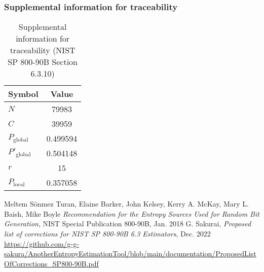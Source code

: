 \documentclass[a3paper,xelatex,english]{bxjsarticle}
\begin{document}
\subsubsection{Supplemental information for traceability}
\renewcommand{\arraystretch}{1.8}
\begin{table}[h]
\caption{Supplemental information for traceability (NIST SP 800-90B Section 6.3.10)}
\begin{center}
\begin{tabular}{|l|c|}
\hline 
\rowcolor{anotherlightblue} %
Symbol				& Value \\ \hline 
$N$				& 79983\\ \hline 
$C$				& 39959\\ \hline 
$P_{\textrm{global}}$				& 0.499594\\ \hline 
$P'_{\textrm{global}}$			& 0.504148\\ \hline 
$r$				& 15\\ \hline 
$P_{\textrm{local}}$ 			& 0.357058\\ \hline
\end{tabular}
\end{center}
\end{table}
\renewcommand{\arraystretch}{1.4}
\begin{thebibliography}{99}
Meltem S\"{o}nmez Turan,
Elaine Barker,
John Kelsey,
Kerry A. McKay,
Mary L. Baish,
Mike Boyle
\textit{Recommendation for the Entropy Sources Used for Random Bit Generation},
NIST Special Publication 800-90B, Jan. 2018
G. Sakurai, \textit{Proposed list of corrections for NIST SP 800-90B 6.3 Estimators}, Dec. 2022
\url{https://github.com/g-g-sakura/AnotherEntropyEstimationTool/blob/main/documentation/ProposedListOfCorrections_SP800-90B.pdf}
\end{thebibliography}
\end{document}
